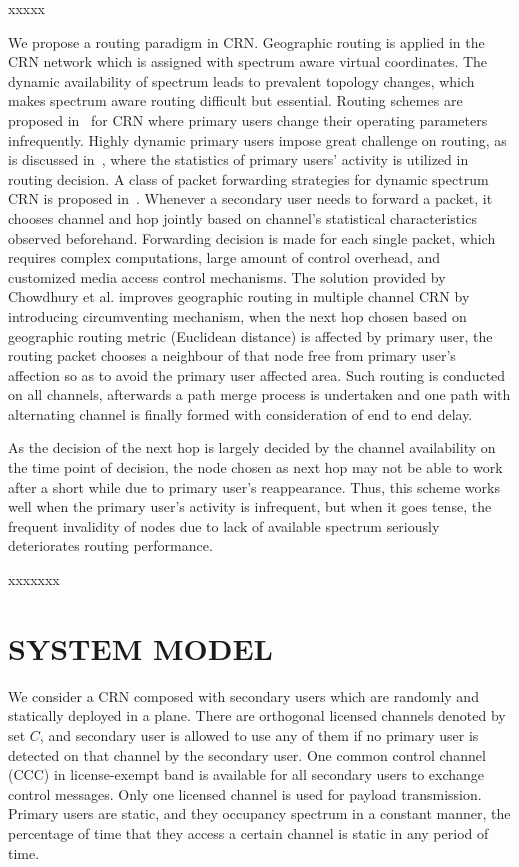 xxxxx


We propose a routing paradigm in CRN.
Geographic routing is applied in the CRN network which is assigned with spectrum aware virtual coordinates.
The dynamic availability of spectrum leads to prevalent topology changes, which makes spectrum aware routing difficult but essential.
Routing schemes are proposed in~\cite{Abbagnale_Gymkhana10, caodv-10wd, segment-crowncom08} for CRN where primary users change their operating parameters infrequently.
Highly dynamic primary users impose great challenge on routing, as is discussed in~\cite{Routing-crn-INFOCOM11}, where the statistics of primary users' activity is utilized in routing decision.
A class of packet forwarding strategies for dynamic spectrum CRN is proposed in~\cite{routing-crn-icc11, routing-crn-jsac12}.
Whenever a secondary user needs to forward a packet, it chooses channel and hop jointly based on channel's statistical characteristics observed beforehand.
Forwarding decision is made for each single packet, which requires complex computations, large amount of control overhead, and customized media access control mechanisms.
The solution provided by Chowdhury et al.\cite{search_geo_routing_chowdhury} improves geographic routing in multiple channel CRN by introducing circumventing mechanism, \ie when the next hop chosen based on geographic routing metric (\eg Euclidean distance) is affected by primary user, the routing packet chooses a neighbour of that node free from primary user's affection so as to avoid the primary user affected area.
Such routing is conducted on all channels, afterwards a path merge process is undertaken and one path with alternating channel is finally formed with consideration of end to end delay.

As the decision of the next hop is largely decided by the channel availability on the time point of decision, the node chosen as next hop may not be able to work after a short while due to primary user's reappearance.
Thus, this scheme works well when the primary user's activity is infrequent, but when it goes tense, the frequent invalidity of nodes due to lack of available spectrum seriously deteriorates routing performance.


xxxxxxx


\section{SYSTEM MODEL}

We consider a CRN composed with secondary users which are randomly and statically deployed in a plane.
There are orthogonal licensed channels denoted by set $C$, and secondary user is allowed to use any of them if no primary user is detected on that channel by the secondary user.
One common control channel (CCC) in license-exempt band is available for all secondary users to exchange control messages.
Only one licensed channel is used for payload transmission.
Primary users are static, and they occupancy spectrum in a constant manner, \eg the percentage of time that they access a certain channel is static in any period of time.

